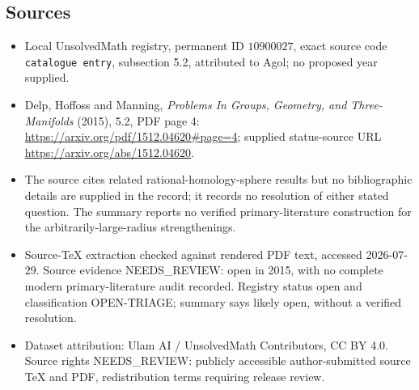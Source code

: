 \documentclass[11pt]{article}
\begin{document}
\subsection{Sources}
\begin{itemize}
\item Local UnsolvedMath registry, permanent ID \(10900027\), exact source code \texttt{catalogue entry}, subsection 5.2, attributed to Agol; no proposed year supplied.
\item Delp, Hoffoss and Manning, \emph{Problems In Groups, Geometry, and Three-Manifolds} (2015), 5.2, PDF page 4: \url{https://arxiv.org/pdf/1512.04620#page=4}; supplied status-source URL \url{https://arxiv.org/abs/1512.04620}.
\item The source cites related rational-homology-sphere results but no bibliographic details are supplied in the record; it records no resolution of either stated question. The summary reports no verified primary-literature construction for the arbitrarily-large-radius strengthenings.
\item Source-TeX extraction checked against rendered PDF text, accessed 2026-07-29. Source evidence NEEDS\_REVIEW: open in 2015, with no complete modern primary-literature audit recorded. Registry status open and classification OPEN-TRIAGE; summary says likely open, without a verified resolution.
\item Dataset attribution: Ulam AI / UnsolvedMath Contributors, CC BY 4.0. Source rights NEEDS\_REVIEW: publicly accessible author-submitted source TeX and PDF, redistribution terms requiring release review.
\end{itemize}
\end{document}
